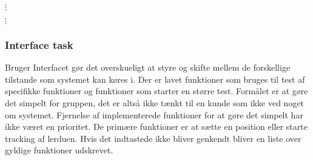 
\(\vdots\)

\(\vdots\)


        
        
\subsubsection{Interface task}
\label{sec:interface}
Bruger Interfacet gør det overskueligt at styre og skifte mellem de forskellige tilstande som systemet kan køres i.
Der er lavet funktioner som bruges til test af specifikke funktioner og funktioner som starter en større test.
Formålet er at gøre det simpelt for gruppen, det er altså ikke tænkt til en kunde som ikke ved noget om systemet.
Fjernelse af implementerede funktioner for at gøre det simpelt har ikke været en prioritet. 
De primære funktioner er at sætte en position eller starte tracking af lerduen.
Hvis det indtastede ikke bliver genkendt bliver en liste over gyldige funktioner udskrevet.

